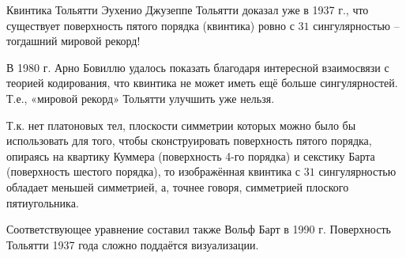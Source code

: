 \begin{surferPage}{Квинтика Тольятти}
Эухенио Джузеппе Тольятти доказал уже в 1937 г., что существует поверхность пятого порядка (квинтика) ровно с $31$ сингулярностью – тогдашний мировой рекорд!


В 1980 г. Арно Бовиллю удалось показать благодаря интересной взаимосвязи с теорией кодирования, что квинтика не может иметь ещё больше сингулярностей. Т.е., «мировой рекорд» Тольятти улучшить уже нельзя.

Т.к. нет платоновых тел, плоскости симметрии которых можно было бы использовать для того, чтобы сконструировать поверхность пятого порядка, опираясь на квартику Куммера (поверхность 4-го порядка) и секстику Барта (поверхность шестого порядка), то изображённая квинтика с $31$ сингулярностью обладает меньшей симметрией, а, точнее говоря, симметрией плоского пятиугольника.

Соответствующее уравнение составил также Вольф Барт в 1990 г. Поверхность Тольятти 1937 года сложно поддаётся визуализации.
\end{surferPage}

